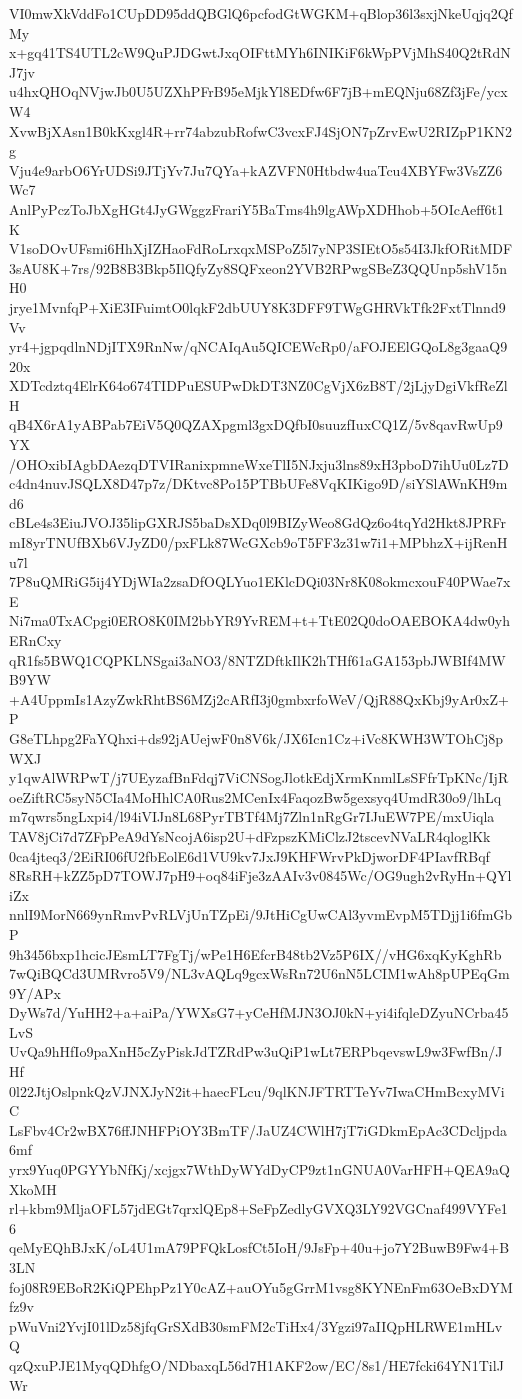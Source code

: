 VI0mwXkVddFo1CUpDD95ddQBGlQ6pcfodGtWGKM+qBlop36l3sxjNkeUqjq2QfMy
x+gq41TS4UTL2cW9QuPJDGwtJxqOIFttMYh6INIKiF6kWpPVjMhS40Q2tRdNJ7jv
u4hxQHOqNVjwJb0U5UZXhPFrB95eMjkYl8EDfw6F7jB+mEQNju68Zf3jFe/ycxW4
XvwBjXAsn1B0kKxgl4R+rr74abzubRofwC3vcxFJ4SjON7pZrvEwU2RIZpP1KN2g
Vju4e9arbO6YrUDSi9JTjYv7Ju7QYa+kAZVFN0Htbdw4uaTcu4XBYFw3VsZZ6Wc7
AnlPyPczToJbXgHGt4JyGWggzFrariY5BaTms4h9lgAWpXDHhob+5OIcAeff6t1K
V1soDOvUFsmi6HhXjIZHaoFdRoLrxqxMSPoZ5l7yNP3SIEtO5s54I3JkfORitMDF
3sAU8K+7rs/92B8B3Bkp5IlQfyZy8SQFxeon2YVB2RPwgSBeZ3QQUnp5shV15nH0
jrye1MvnfqP+XiE3IFuimtO0lqkF2dbUUY8K3DFF9TWgGHRVkTfk2FxtTlnnd9Vv
yr4+jgpqdlnNDjITX9RnNw/qNCAIqAu5QICEWcRp0/aFOJEElGQoL8g3gaaQ920x
XDTcdztq4ElrK64o674TIDPuESUPwDkDT3NZ0CgVjX6zB8T/2jLjyDgiVkfReZlH
qB4X6rA1yABPab7EiV5Q0QZAXpgml3gxDQfbI0suuzfIuxCQ1Z/5v8qavRwUp9YX
/OHOxibIAgbDAezqDTVIRanixpmneWxeTlI5NJxju3lns89xH3pboD7ihUu0Lz7D
c4dn4nuvJSQLX8D47p7z/DKtvc8Po15PTBbUFe8VqKIKigo9D/siYSlAWnKH9md6
cBLe4s3EiuJVOJ35lipGXRJS5baDsXDq0l9BIZyWeo8GdQz6o4tqYd2Hkt8JPRFr
mI8yrTNUfBXb6VJyZD0/pxFLk87WcGXcb9oT5FF3z31w7i1+MPbhzX+ijRenHu7l
7P8uQMRiG5ij4YDjWIa2zsaDfOQLYuo1EKlcDQi03Nr8K08okmcxouF40PWae7xE
Ni7ma0TxACpgi0ERO8K0IM2bbYR9YvREM+t+TtE02Q0doOAEBOKA4dw0yhERnCxy
qR1fs5BWQ1CQPKLNSgai3aNO3/8NTZDftkIlK2hTHf61aGA153pbJWBIf4MWB9YW
+A4UppmIs1AzyZwkRhtBS6MZj2cARfI3j0gmbxrfoWeV/QjR88QxKbj9yAr0xZ+P
G8eTLhpg2FaYQhxi+ds92jAUejwF0n8V6k/JX6Icn1Cz+iVc8KWH3WTOhCj8pWXJ
y1qwAlWRPwT/j7UEyzafBnFdqj7ViCNSogJlotkEdjXrmKnmlLsSFfrTpKNc/IjR
oeZiftRC5syN5CIa4MoHhlCA0Rus2MCenIx4FaqozBw5gexsyq4UmdR30o9/lhLq
m7qwrs5ngLxpi4/l94iVIJn8L68PyrTBTf4Mj7Zln1nRgGr7IJuEW7PE/mxUiqla
TAV8jCi7d7ZFpPeA9dYsNcojA6isp2U+dFzpszKMiClzJ2tscevNVaLR4qloglKk
0ca4jteq3/2EiRI06fU2fbEolE6d1VU9kv7JxJ9KHFWrvPkDjworDF4PIavfRBqf
8RsRH+kZZ5pD7TOWJ7pH9+oq84iFje3zAAIv3v0845Wc/OG9ugh2vRyHn+QYliZx
nnlI9MorN669ynRmvPvRLVjUnTZpEi/9JtHiCgUwCAl3yvmEvpM5TDjj1i6fmGbP
9h3456bxp1hcicJEsmLT7FgTj/wPe1H6EfcrB48tb2Vz5P6IX//vHG6xqKyKghRb
7wQiBQCd3UMRvro5V9/NL3vAQLq9gcxWsRn72U6nN5LCIM1wAh8pUPEqGm9Y/APx
DyWs7d/YuHH2+a+aiPa/YWXsG7+yCeHfMJN3OJ0kN+yi4ifqleDZyuNCrba45LvS
UvQa9hHfIo9paXnH5cZyPiskJdTZRdPw3uQiP1wLt7ERPbqevswL9w3FwfBn/JHf
0l22JtjOslpnkQzVJNXJyN2it+haecFLcu/9qlKNJFTRTTeYv7IwaCHmBcxyMViC
LsFbv4Cr2wBX76ffJNHFPiOY3BmTF/JaUZ4CWlH7jT7iGDkmEpAc3CDcljpda6mf
yrx9Yuq0PGYYbNfKj/xcjgx7WthDyWYdDyCP9zt1nGNUA0VarHFH+QEA9aQXkoMH
rl+kbm9MljaOFL57jdEGt7qrxlQEp8+SeFpZedlyGVXQ3LY92VGCnaf499VYFe16
qeMyEQhBJxK/oL4U1mA79PFQkLosfCt5IoH/9JsFp+40u+jo7Y2BuwB9Fw4+B3LN
foj08R9EBoR2KiQPEhpPz1Y0cAZ+auOYu5gGrrM1vsg8KYNEnFm63OeBxDYMfz9v
pWuVni2YvjI01lDz58jfqGrSXdB30smFM2cTiHx4/3Ygzi97aIIQpHLRWE1mHLvQ
qzQxuPJE1MyqQDhfgO/NDbaxqL56d7H1AKF2ow/EC/8s1/HE7fcki64YN1TilJWr
